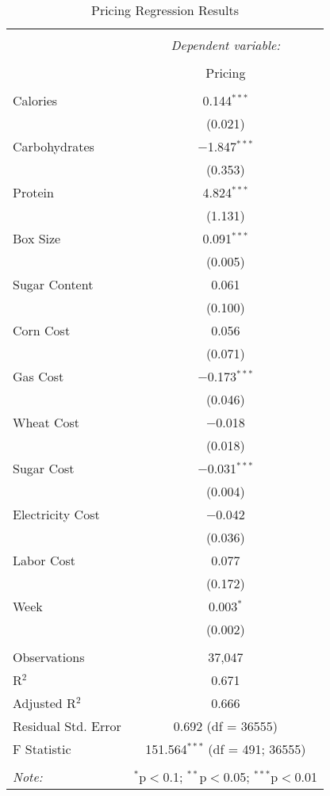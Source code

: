 \documentclass[12pt,english]{article}
\begin{document}
\begin{table}[!htbp]\centering 
  \caption{Pricing Regression Results} 
  \label{} 
\begin{tabular}{@{\extracolsep{5pt}}lc} 
\\[-1.8ex]\hline 
\hline \\[-1.8ex] 
 & \multicolumn{1}{c}{\textit{Dependent variable:}} \\ 
\cline{2-2} 
\\[-1.8ex] & Pricing \\ 
\hline \\[-1.8ex] 
 Calories  & 0.144$^{***}$ \\ 
  & (0.021) \\ 
 Carbohydrates & $-$1.847$^{***}$ \\ 
  & (0.353) \\ 
 Protein & 4.824$^{***}$ \\ 
  & (1.131) \\ 
 Box Size & 0.091$^{***}$ \\ 
  & (0.005) \\ 
 Sugar Content & 0.061 \\ 
  & (0.100) \\ 
 Corn Cost & 0.056 \\ 
  & (0.071) \\ 
 Gas Cost & $-$0.173$^{***}$ \\ 
  & (0.046) \\ 
 Wheat Cost & $-$0.018 \\ 
  & (0.018) \\ 
 Sugar Cost & $-$0.031$^{***}$ \\ 
  & (0.004) \\ 
 Electricity Cost & $-$0.042 \\ 
  & (0.036) \\ 
 Labor Cost & 0.077 \\ 
  & (0.172) \\ 
 Week & 0.003$^{*}$ \\ 
  & (0.002) \\ 
\hline \\[-1.8ex] 
Observations & 37,047 \\ 
R$^{2}$ & 0.671 \\ 
Adjusted R$^{2}$ & 0.666 \\ 
Residual Std. Error & 0.692 (df = 36555) \\ 
F Statistic & 151.564$^{***}$ (df = 491; 36555) \\ 
\hline 
\hline \\[-1.8ex] 
\textit{Note:}  & \multicolumn{1}{r}{$^{*}$p$<$0.1; $^{**}$p$<$0.05; $^{***}$p$<$0.01} \\ 
\end{tabular} 
\end{table} 
\end{document}
